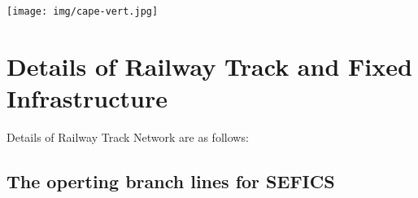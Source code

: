 
\begin{center}
 \texttt{[image: img/cape-vert.jpg]}
\end{center}




\section{Details of Railway Track and Fixed Infrastructure}

Details of Railway Track Network are as follows:

\subsection{The operting branch lines for SEFICS}

